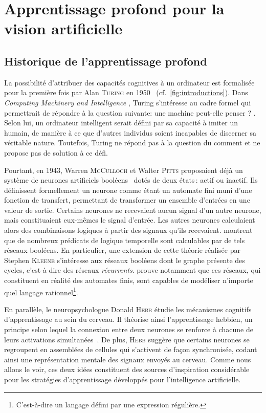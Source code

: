 \section{Apprentissage profond pour la vision artificielle}

\subsection{Historique de l'apprentissage profond}

La possibilité d'attribuer des capacités cognitives à un ordinateur est formalisée pour la première fois par Alan \textsc{Turing} en 1950~\cite{turing_computing_1950} (cf.~\cref{fig:introductions}). Dans \og \emph{Computing Machinery and Intelligence} \fg, Turing s'intéresse au cadre formel qui permettrait de répondre à la question suivante: \og{} une machine peut-elle penser ? \fg{}. Selon lui, un ordinateur intelligent serait défini par sa capacité à imiter un humain, de manière à ce que d'autres individus soient incapables de discerner sa véritable nature. Toutefois, Turing ne répond pas à la question du \og comment \fg{} et ne propose pas de solution à ce défi.

Pourtant, en 1943, Warren \textsc{McCulloch} et Walter \textsc{Pitts} proposaient déjà un système de neurones artificiels booléens~\cite{mcculloch_logical_1943} dotés de deux états\,: actif ou inactif. Ils définissent formellement un neurone comme étant un automate fini muni d'une fonction de transfert, permettant de transformer un ensemble d'entrées en une valeur de sortie. Certains neurones ne recevaient aucun signal d'un autre neurone, mais constituaient eux-mêmes le signal d'entrée. Les autres neurones calculaient alors des combinaisons logiques à partir des signaux qu'ils recevaient. \citet{mcculloch_logical_1943} montrent que de nombreux prédicats de logique temporelle sont calculables par de tels réseaux booléens. En particulier, une extension de cette théorie réalisée par Stephen \textsc{Kleene} s'intéresse aux réseaux booléens dont le graphe présente des cycles, c'est-à-dire des réseaux \emph{récurrents}. \citet{kleene_representation_1956} prouve notamment que ces réseaux, qui constituent en réalité des automates finis, sont capables de modéliser n'importe quel langage rationnel\footnote{C'est-à-dire un langage défini par une expression régulière.}.

En parallèle, le neuropsychologue Donald \textsc{Hebb} étudie les mécanismes cognitifs d'apprentissage au sein du cerveau. Il théorise ainsi l'apprentissage hebbien, un principe selon lequel la connexion entre deux neurones se renforce à chacune de leurs activations simultanées~\cite{hebb_organization_1949}. De plus, \textsc{Hebb} suggère que certains neurones se regroupent en \og{} assemblées de cellules \fg{} qui s'activent de façon synchronisée, codant ainsi une représentation mentale des signaux envoyés au cerveau. Comme nous allons le voir, ces deux idées constituent des sources d'inspiration considérable pour les stratégies d'apprentissage développés pour l'intelligence artificielle.


